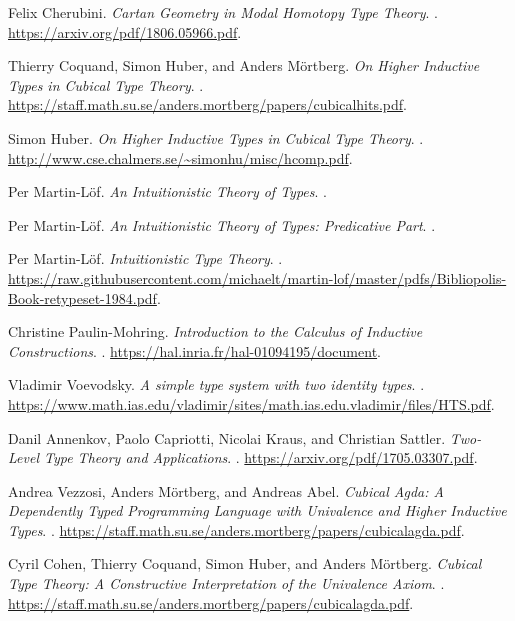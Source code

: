 \documentclass{article}
\theoremstyle{definition}
\begin{document}
\newpage
\begin{thebibliography}{99}

Felix Cherubini.
\newblock \emph{Cartan Geometry in Modal Homotopy Type Theory}.
. \url{https://arxiv.org/pdf/1806.05966.pdf}.

Thierry Coquand, Simon Huber, and Anders Mörtberg.
\newblock \emph{On Higher Inductive Types in Cubical Type Theory}.
. \url{https://staff.math.su.se/anders.mortberg/papers/cubicalhits.pdf}.

Simon Huber.
\newblock \emph{On Higher Inductive Types in Cubical Type Theory}.
. \url{http://www.cse.chalmers.se/~simonhu/misc/hcomp.pdf}.

Per Martin-Löf.
\newblock \emph{An Intuitionistic Theory of Types}.
.

Per Martin-Löf.
\newblock \emph{An Intuitionistic Theory of Types: Predicative Part}.
.

Per Martin-Löf.
\newblock \emph{Intuitionistic Type Theory}.
. \url{https://raw.githubusercontent.com/michaelt/martin-lof/master/pdfs/Bibliopolis-Book-retypeset-1984.pdf}.

Christine Paulin-Mohring.
\newblock \emph{Introduction to the Calculus of Inductive Constructions}.
. \url{https://hal.inria.fr/hal-01094195/document}.

Vladimir Voevodsky.
\newblock \emph{A simple type system with two identity types}.
. \url{https://www.math.ias.edu/vladimir/sites/math.ias.edu.vladimir/files/HTS.pdf}.

Danil Annenkov, Paolo Capriotti, Nicolai Kraus, and Christian Sattler.
\newblock \emph{Two-Level Type Theory and Applications}.
. \url{https://arxiv.org/pdf/1705.03307.pdf}.

Andrea Vezzosi, Anders Mörtberg, and Andreas Abel.
\newblock \emph{Cubical Agda: A Dependently Typed Programming Language with Univalence and Higher Inductive Types}.
. \url{https://staff.math.su.se/anders.mortberg/papers/cubicalagda.pdf}.

Cyril Cohen, Thierry Coquand, Simon Huber, and Anders Mörtberg.
\newblock \emph{Cubical Type Theory: A Constructive Interpretation of the Univalence Axiom}.
. \url{https://staff.math.su.se/anders.mortberg/papers/cubicalagda.pdf}.


\end{thebibliography}
\end{document}
